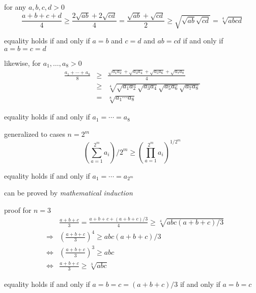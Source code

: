\documentclass[17pt,landscape]{foils}
\begin{document}
{

\bit
	\item for any $a,b,c,d>0$
	\[
		\frac{a+b+c+d}{4}
		\geq
			\frac{2\sqrt{ab} + 2\sqrt{cd}}{4}
		=
			\frac{\sqrt{ab} + \sqrt{cd}}{2}
		\geq
			\sqrt{\sqrt{ab} \sqrt{cd}}
		=
			\sqrt[4]{abcd}
	\]
	\bit
		\item equality holds if and only if $a=b$ and $c=d$ and $ab=cd$
		if and only if $a=b=c=d$
	\eit

	\vitem likewise, for $a_1,\ldots,a_8>0$
	\begin{eqnarray*}
			\frac{a_1+\cdots+a_8}{8}
		&\geq&
			\frac{\sqrt{a_1a_2} + \sqrt{a_3a_4} + \sqrt{a_5a_6} + \sqrt{a_7a_8}}{4}
		\\
		&\geq&
			\sqrt[4]{\sqrt{a_1a_2} \sqrt{a_3a_4} \sqrt{a_5a_6} \sqrt{a_7a_8}}
		\\
		&=&
			\sqrt[8]{a_1\cdots a_8}
	\end{eqnarray*}
	\bit
		\item equality holds if and only if $a_1=\cdots=a_8$
	\eit
\eit



\bit
	\item generalized to cases $n=2^m$
	\[
		\left(\sum_{a=1}^{2^m} a_i\right) / 2^m\geq \left({\prod_{a=1}^{2^m} a_i}\right)^{1/2^m}
	\]
	\bit
		\item equality holds if and only if $a_1=\cdots=a_{2^m}$
	\eit

	\vitem can be proved by \emph{mathematical induction}
\eit



\bit
	\item proof for $n=3$
		\begin{eqnarray*}
		&&
			\frac{a+b+c}{3} = \frac{a + b + c + (a+b+c)/3}{4}
			\geq \sqrt[4]{abc(a+b+c)/3}
		\\
		&\Rightarrow&
			\left(\frac{a+b+c}{3}\right)^4 \geq {abc(a+b+c)/3}
		\\
		&\Leftrightarrow&
			\left(\frac{a+b+c}{3}\right)^3 \geq abc
		\\
		&\Leftrightarrow&
			\frac{a+b+c}{3} \geq \sqrt[3]{abc}
		\end{eqnarray*}
		\bit
			\item equality holds if and only if $a=b=c=(a+b+c)/3$ if and only if $a=b=c$
		\eit
\eit



}
\end{document}
